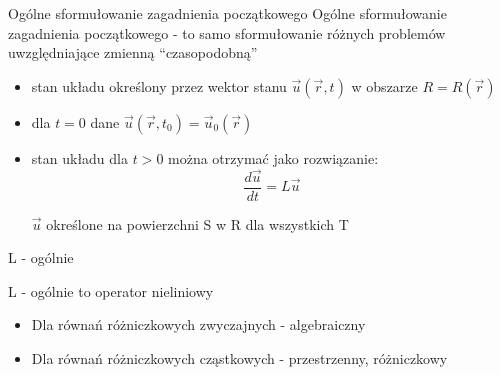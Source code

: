\begin{frame}{Ogólne sformułowanie zagadnienia początkowego}
  Ogólne sformułowanie zagadnienia początkowego - to samo sformułowanie różnych problemów uwzględniające zmienną ``czasopodobną''
  \begin{itemize}
    \item stan układu określony przez wektor stanu $\vec{u}(\vec{r},t)$ w obszarze $R = R(\vec{r})$
    \item dla $ t = 0 $ dane $\vec{u}(\vec{r},t_0) = \vec{u}_0(\vec{r})$
    \item stan układu dla $ t > 0$ można otrzymać jako rozwiązanie:
    $$\frac{d\vec{u}}{dt} = L\vec{u}$$ \par
    \begin{center}
    	$\vec{u}$ określone na powierzchni S w R dla wszystkich T
    \end{center}
  \end{itemize}

\end{frame}
\begin{frame}{L - ogólnie}
\begin{block}{}
  L - ogólnie to operator nieliniowy
	\begin{itemize}
    	\item Dla równań różniczkowych zwyczajnych - algebraiczny
    	\item Dla równań różniczkowych cząstkowych - przestrzenny, różniczkowy
 	\end{itemize}
\end{block}


\end{frame}
